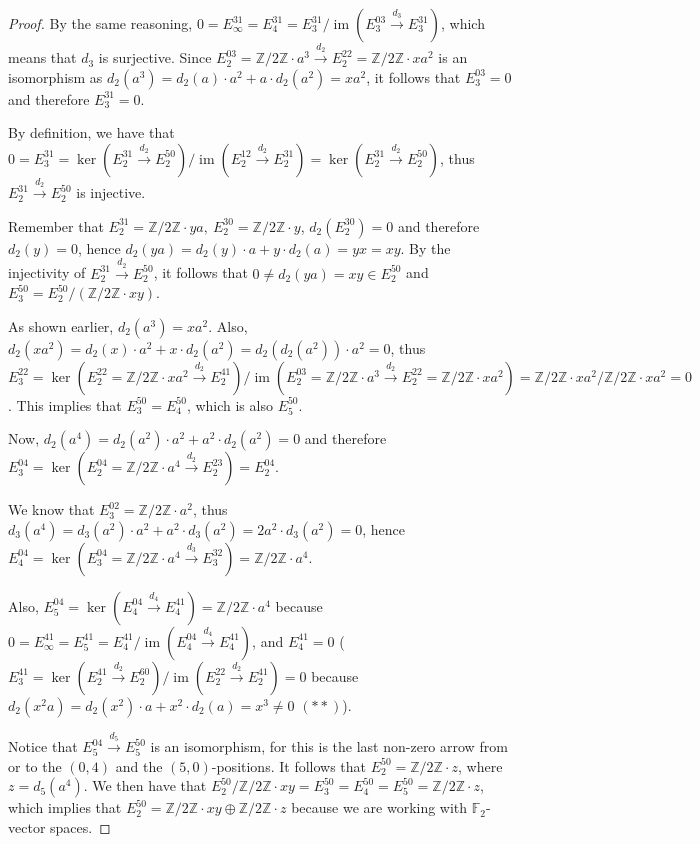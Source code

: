 \documentclass{article}
\newcommand{\numberset}{\mathbb}
\newcommand{\Z}{\numberset{Z}}
\newcommand{\F}{\numberset{F}}
\DeclareMathOperator{\im}{im}
\begin{document}
\begin{proof}
    By the same reasoning,
    $0=E^{31}_\infty=E^{31}_4=E^{31}_3/\im(E^{03}_3\xrightarrow{d_3}E^{31}_3)$,
    which means that $d_3$ is surjective. Since $E^{03}_2=\Z/2\Z\cdot
    a^3\xrightarrow{d_2} E^{22}_2=\Z/2\Z\cdot xa^2$ is an isomorphism as
    $d_2(a^3)=d_2(a)\cdot a^2+a\cdot d_2(a^2)=xa^2$, it follows that
    $E^{03}_3=0$ and therefore $E^{31}_3=0$.

    By definition, we have that
    $0=E^{31}_3=\ker(E^{31}_2\xrightarrow{d_2}E^{50}_2)/
    \im(E^{12}_2\xrightarrow{d_2}E^{31}_2)
    =\ker(E^{31}_2\xrightarrow{d_2}E^{50}_2)$, thus
    $E^{31}_2\xrightarrow{d_2}E^{50}_2$ is injective.
    
    Remember that $E^{31}_2=\Z/2\Z\cdot ya,\ E^{30}_2=\Z/2\Z\cdot y$,
    $d_2(E^{30}_2)=0$ and therefore $d_2(y)=0$, hence $d_2(ya)=d_2(y)\cdot
    a+y\cdot d_2(a)=yx=xy$. By the injectivity of
    $E^{31}_2\xrightarrow{d_2}E^{50}_2$, it follows that $0\neq d_2(ya)=xy\in
    E^{50}_2$ and $E^{50}_3=E^{50}_2/(\Z/2\Z\cdot xy)$.

    As shown earlier, $d_2(a^3)=xa^2$. Also, $d_2(xa^2)=d_2(x)\cdot a^2+x\cdot
    d_2(a^2)=d_2(d_2(a^2))\cdot a^2=0$, thus
    $E^{22}_3=\ker(E^{22}_2=\Z/2\Z\cdot xa^2\xrightarrow{d_2}E^{41}_2)/
    \im(E^{03}_2=\Z/2\Z\cdot a^3\xrightarrow{d_2}E^{22}_2=\Z/2\Z\cdot
    xa^2)=\Z/2\Z\cdot xa^2/\Z/2\Z\cdot xa^2=0$. This implies that
    $E^{50}_3=E^{50}_4$, which is also $E^{50}_5$.

    Now, $d_2(a^4)=d_2(a^2)\cdot a^2+a^2\cdot d_2(a^2)=0$ and therefore
    $E^{04}_3=\ker(E^{04}_2=\Z/2\Z\cdot a^4\xrightarrow{d_2}E^{23}_2)=E^{04}_2$.

    We know that $E^{02}_3=\Z/2\Z\cdot a^2$, thus $d_3(a^4)=d_3(a^2)\cdot
    a^2+a^2\cdot d_3(a^2)=2a^2\cdot d_3(a^2)=0$, hence
    $E^{04}_4=\ker(E^{04}_3=\Z/2\Z\cdot
    a^4\xrightarrow{d_3}E^{32}_3)=\Z/2\Z\cdot a^4$. 
    
    Also,
    $E^{04}_5=\ker(E^{04}_4\xrightarrow{d_4}E^{41}_4)=\Z/2\Z\cdot a^4$ because
    $0=E^{41}_\infty=E^{41}_5=E^{41}_4/\im(E^{04}_4\xrightarrow{d_4}E^{41}_4)$,
    and $E^{41}_4=0$ ($E^{41}_3=\ker(E^{41}_2\xrightarrow{d_2}E^{60}_2)/
    \im(E^{22}_2\xrightarrow{d_2}E^{41}_2)=0$ because $d_2(x^2a)=d_2(x^2)\cdot
    a+x^2\cdot d_2(a)=x^3\neq 0$ $(**)$).
    
    Notice that $E^{04}_5\xrightarrow{d_5}E^{50}_5$ is an isomorphism, for this
    is the last non-zero arrow from or to the $(0,4)$ and the $(5,0)$-positions.
    It follows that $E^{50}_2=\Z/2\Z\cdot z$, where $z=d_5(a^4)$. We then have
    that $E^{50}_2/\Z/2\Z\cdot xy=E^{50}_3=E^{50}_4=E^{50}_5=\Z/2\Z\cdot z$,
    which implies that $E^{50}_2=\Z/2\Z\cdot xy\oplus\Z/2\Z\cdot z$ because we
    are working with $\F_2$-vector spaces.


\end{proof}
\end{document}
